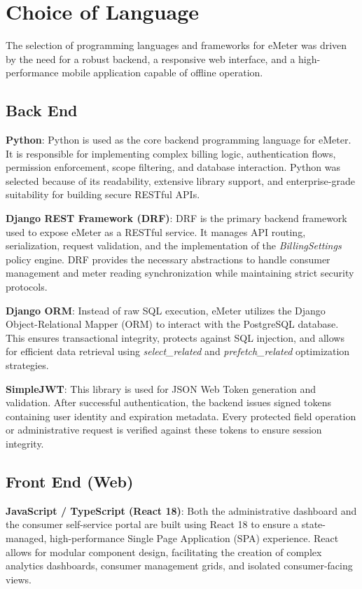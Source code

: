 \documentclass[12pt, a4paper, onecolumn]{report}
\begin{document}
\section{Choice of Language}

The selection of programming languages and frameworks for eMeter was driven by the need for a robust backend, a responsive web interface, and a high-performance mobile application capable of offline operation.

\subsection{Back End}
\textbf{Python}: Python is used as the core backend programming language for eMeter. It is responsible for implementing complex billing logic, authentication flows, permission enforcement, scope filtering, and database interaction. Python was selected because of its readability, extensive library support, and enterprise-grade suitability for building secure RESTful APIs.

\textbf{Django REST Framework (DRF)}: DRF is the primary backend framework used to expose eMeter as a RESTful service. It manages API routing, serialization, request validation, and the implementation of the \textit{BillingSettings} policy engine. DRF provides the necessary abstractions to handle consumer management and meter reading synchronization while maintaining strict security protocols.

\textbf{Django ORM}: Instead of raw SQL execution, eMeter utilizes the Django Object-Relational Mapper (ORM) to interact with the PostgreSQL database. This ensures transactional integrity, protects against SQL injection, and allows for efficient data retrieval using \textit{select\_related} and \textit{prefetch\_related} optimization strategies.

\textbf{SimpleJWT}: This library is used for JSON Web Token generation and validation. After successful authentication, the backend issues signed tokens containing user identity and expiration metadata. Every protected field operation or administrative request is verified against these tokens to ensure session integrity.

\subsection{Front End (Web)}
\textbf{JavaScript / TypeScript (React 18)}: Both the administrative dashboard and the consumer self-service portal are built using React 18 to ensure a state-managed, high-performance Single Page Application (SPA) experience. React allows for modular component design, facilitating the creation of complex analytics dashboards, consumer management grids, and isolated consumer-facing views.
\end{document}
